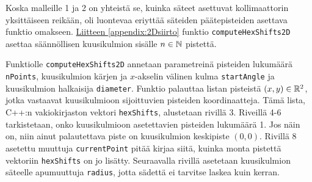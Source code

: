 
Koska malleille 1 ja 2 on yhteistä se, kuinka säteet asettuvat kollimaattorin yksittäiseen reikään, oli luontevaa eriyttää säteiden päätepisteiden asettava funktio omakseen. \hyperref[appendix:2Dsiirto]{Liitteen \ref*{appendix:2Dsiirto}} funktio \texttt{computeHexShifts2D} asettaa säännöllisen kuusikulmion sisälle $n\in\mathbb{N}$ pistettä.

Funktiolle \texttt{computeHexShifts2D} annetaan parametreinä pisteiden lukumäärä \texttt{nPoints}, kuusikulmion kärjen ja $x$-akselin välinen kulma \texttt{startAngle} ja kuusikulmion halkaisija \texttt{diameter}. Funktio palauttaa listan pisteistä $(x, y)\in\mathbb{R}^2$, jotka vastaavat kuusikulmioon sijoittuvien pisteiden koordinaatteja. Tämä lista, C++:n vakiokirjaston vektori \texttt{hexShifts}, alustetaan rivillä 3. Riveillä 4-6 tarkistetaan, onko kuusikulmioon asetettavien pisteiden lukumäärä 1. Jos näin on, niin ainut palautettava piste on kuusikulmion keskipiste $(0, 0)$. Rivillä 8 asetettu muuttuja \texttt{currentPoint} pitää kirjaa siitä, kuinka monta pistettä vektoriin \texttt{hexShifts} on jo lisätty. Seuraavalla rivillä asetetaan kuusikulmion säteelle apumuuttuja \texttt{radius}, jotta sädettä ei tarvitse laskea kuin kerran.

